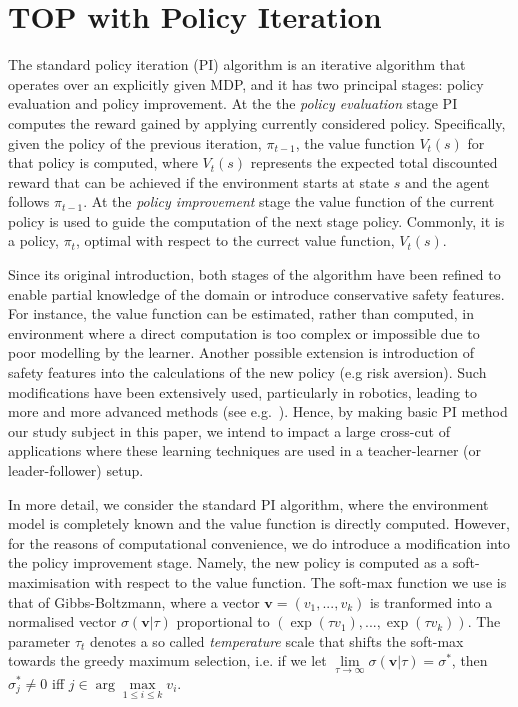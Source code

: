 
\section{TOP with Policy Iteration}\label{sec: TOP-PI}
The standard policy iteration (PI) algorithm is an iterative algorithm
that operates over an explicitly given MDP\cite{puterman_book_94}, and
it has two principal stages: policy evaluation and policy
improvement. At the the {\em policy evaluation} stage PI computes the
reward gained by applying currently considered policy. Specifically,
given the policy of the previous iteration, $\pi_{t-1}$, the value
function $V_t(s)$ for that policy is computed, where $V_t(s)$
represents the expected total discounted reward that can be achieved
if the environment starts at state $s$ and the agent follows
$\pi_{t-1}$. At the {\em policy improvement} stage the value function
of the current policy is used to guide the computation of the next
stage policy. Commonly, it is a policy, $\pi_{t}$, optimal with
respect to the currect value function, $V_t(s)$.

Since its original introduction, both stages of the algorithm have
been refined to enable partial knowledge of the domain or introduce
conservative safety features. For instance, the value function can be
estimated, rather than computed, in environment where a direct
computation is too complex or impossible due to poor modelling by the
learner. Another possible extension is introduction of safety features
into the calculations of the new policy (e.g risk aversion). Such
modifications have been extensively used, particularly in robotics,
leading to more and more advanced methods (see
e.g.~\cite{sugiyama_et_al_2009}). Hence, by making basic PI method our
study subject in this paper, we intend to impact a large cross-cut of
applications where these learning techniques are used in a
teacher-learner (or leader-follower) setup.

In more detail, we consider the standard PI algorithm, where the
environment model is completely known and the value function is
directly computed. However, for the reasons of computational
convenience, we do introduce a modification into the policy
improvement stage. Namely, the new policy is computed as a
soft-maximisation with respect to the value function. The soft-max
function we use is that of Gibbs-Boltzmann, where a vector
$\mathbf{v}=(v_1,...,v_k)$ is tranformed into a normalised vector
$\sigma(\mathbf{v}|\tau)$ proportional to $(\exp(\tau
v_1),...,\exp(\tau v_k))$. The parameter $\tau_t$ denotes a so called
{\em temperature} scale that shifts the soft-max towards the greedy
maximum selection, i.e. if we let
$\lim\limits_{\tau\rightarrow\infty}\sigma(\mathbf{v}|\tau)=\sigma^*$,
then $\sigma^*_j\neq 0$ iff $j\in\arg\max\limits_{1\leq i\leq k}v_i$.

